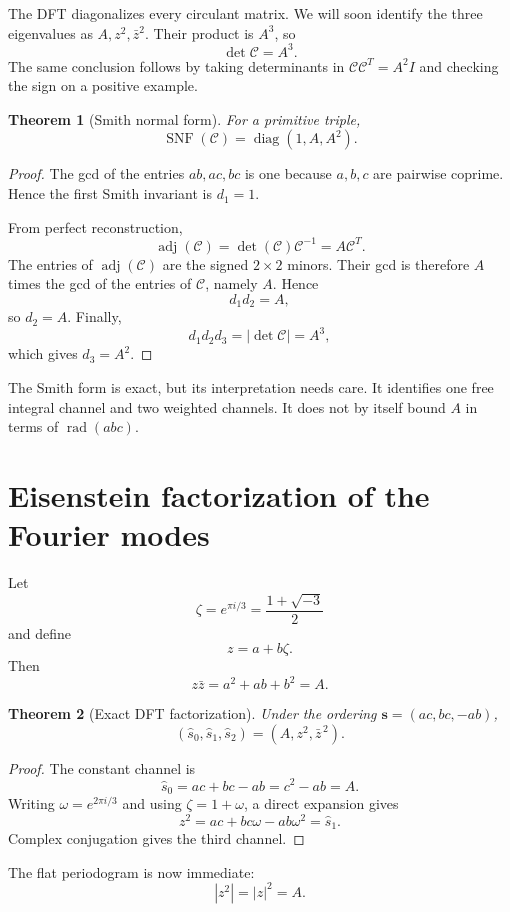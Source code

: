 \documentclass[11pt]{article}
\newtheorem{theorem}{Theorem}[section]
\newcommand{\rad}{\operatorname{rad}}
\newcommand{\SNF}{\operatorname{SNF}}
\newcommand{\calC}{\mathcal C}
\begin{document}
The DFT diagonalizes every circulant matrix.  We will soon identify the three eigenvalues as $A,z^2,\bar z^2$.  Their product is $A^3$, so
\[
  \det\calC=A^3.
\]
The same conclusion follows by taking determinants in $\calC\calC^T=A^2I$ and checking the sign on a positive example.

\begin{theorem}[Smith normal form]
For a primitive triple,
\[
  \boxed{\SNF(\calC)=\operatorname{diag}(1,A,A^2).}
\]
\end{theorem}

\begin{proof}
The gcd of the entries $ab,ac,bc$ is one because $a,b,c$ are pairwise coprime.  Hence the first Smith invariant is $d_1=1$.

From perfect reconstruction,
\[
  \operatorname{adj}(\calC)
  =\det(\calC)\calC^{-1}
  =A\calC^T.
\]
The entries of $\operatorname{adj}(\calC)$ are the signed $2\times2$ minors.  Their gcd is therefore $A$ times the gcd of the entries of $\calC$, namely $A$.  Hence
\[
  d_1d_2=A,
\]
so $d_2=A$.  Finally,
\[
  d_1d_2d_3=|\det\calC|=A^3,
\]
which gives $d_3=A^2$.
\end{proof}

The Smith form is exact, but its interpretation needs care.  It identifies one free integral channel and two weighted channels.  It does not by itself bound $A$ in terms of $\rad(abc)$.

\section{Eisenstein factorization of the Fourier modes}

Let
\[
  \zeta=e^{\pi i/3}=\frac{1+\sqrt{-3}}2
\]
and define
\[
  z=a+b\zeta.
\]
Then
\[
  z\bar z=a^2+ab+b^2=A.
\]

\begin{theorem}[Exact DFT factorization]
Under the ordering $\mathbf s=(ac,bc,-ab)$,
\[
  \boxed{(\widehat s_0,\widehat s_1,\widehat s_2)
  =(A,z^2,\bar z^{\,2}).}
\]
\end{theorem}

\begin{proof}
The constant channel is
\[
  \widehat s_0=ac+bc-ab=c^2-ab=A.
\]
Writing $\omega=e^{2\pi i/3}$ and using $\zeta=1+\omega$, a direct expansion gives
\[
  z^2=ac+bc\omega-ab\omega^2=\widehat s_1.
\]
Complex conjugation gives the third channel.
\end{proof}

The flat periodogram is now immediate:
\[
  |z^2|=|z|^2=A.
\]
\end{document}
